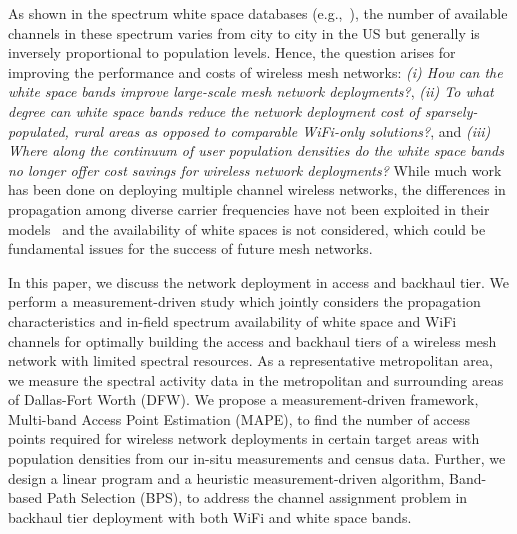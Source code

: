 As shown in the spectrum white space databases (e.g.,~\cite{googledatabase}), the number of available 
channels in these spectrum varies from city to city in the US but generally is inversely proportional to population levels. 
Hence, the question arises for 
improving the performance and costs of wireless mesh networks: {\it (i) How can the 
white space bands improve large-scale mesh network deployments?}, {\it (ii) To what degree can 
white space bands reduce the network deployment cost of sparsely-populated, rural areas as opposed 
to comparable WiFi-only solutions?}, and {\it (iii) Where along the continuum of user population 
densities do the white space bands no longer offer cost savings for wireless network deployments?} 
While much work has been done on deploying multiple channel wireless networks, the differences in 
propagation among diverse carrier frequencies have not been exploited in their models~\cite{tang2005interference, 
doraghinejad2014channel} and the availability of white spaces is not considered, which could be fundamental 
issues for the success of future mesh networks. 


In this paper, we discuss the network deployment in access and backhaul tier.
We perform a measurement-driven study which jointly considers the propagation 
characteristics and in-field spectrum availability of white space and WiFi channels 
for optimally building the access and backhaul tiers of a wireless mesh network with limited spectral resources.
As a representative metropolitan area, we measure the spectral activity data in the metropolitan 
and surrounding areas of Dallas-Fort Worth (DFW).  
We propose a measurement-driven framework, Multi-band Access Point Estimation (MAPE), to find the 
number of access points required for wireless network deployments in certain target areas with population 
densities from our in-situ measurements and census data. 
Further, we design a linear program and a heuristic measurement-driven algorithm, Band-based Path Selection (BPS), 
to address the channel assignment problem in backhaul tier deployment with both WiFi and white space bands. 


